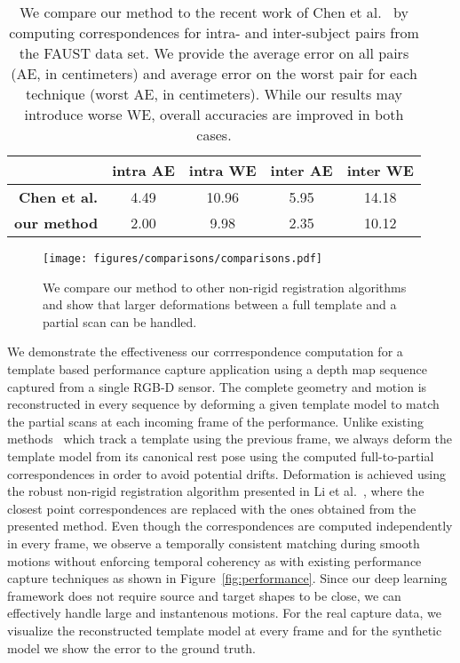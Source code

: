 \documentclass[10pt,twocolumn,letterpaper]{article}
\begin{document}
\begin{table}[]
\footnotesize
\centering
\begin{tabular}{rcccc}
\hline
\textbf{}              & intra AE              & intra WE             & inter AE            & inter WE \\ \hline
\textbf{Chen et al.}         & 4.49 & 10.96 & 5.95 & 14.18  \\
\textbf{our method} 		  & 2.00 & 9.98 & 2.35 & 10.12 \\ \hline
\end{tabular}
\caption{We compare our method to the recent work of Chen et al.~\cite{chen15} by computing correspondences for intra- and inter-subject pairs from the FAUST data set. We provide the average error on all pairs (AE, in centimeters) and average error on the worst pair for each technique (worst AE, in centimeters). While our results may introduce worse WE, overall accuracies are improved in both cases.}
\vnudge
\label{table:comparison}
\end{table}\normalsize\begin{figure}[t]
\begin{center}
   \texttt{[image: figures/comparisons/comparisons.pdf]}
    \vspace{-25pt}
\end{center}
   \caption{We compare our method to other non-rigid registration algorithms and show that larger deformations between a full template and a partial scan can be handled.}
   \vnudge
\label{fig:comparisons}
\end{figure} We demonstrate the effectiveness our corrrespondence computation for a template based performance capture application using a depth map sequence captured from a single RGB-D sensor. The complete geometry and motion is reconstructed in every sequence by deforming a given template model to match the partial scans at each incoming frame of the performance. Unlike existing methods~\cite{sue:4drec:2008,li09robust,Wand09efficient,Tevs:2012:ACR} which track a template using the previous frame, we always deform the template model from its canonical rest pose using the computed full-to-partial correspondences in order to avoid potential drifts. Deformation is achieved using the robust non-rigid registration algorithm presented in Li et al.~\cite{li09robust}, where the closest point correspondences are replaced with the ones obtained from the presented method.
Even though the correspondences are computed independently in every frame, we observe a temporally consistent matching during smooth motions without enforcing temporal coherency as with existing performance capture techniques as shown in Figure~\ref{fig:performance}. Since our deep learning framework does not require source and target shapes to be close, we can effectively handle large and instantenous motions. For the real capture data, we visualize the reconstructed template model at every frame and for the synthetic model we show the error to the ground truth.
\end{document}
